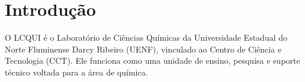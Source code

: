 \section{Introdução}

O LCQUI é o Laboratório de Ciências Químicas da Universidade Estadual do Norte Fluminense Darcy Ribeiro (UENF), vinculado ao Centro de Ciência e Tecnologia (CCT). Ele funciona como uma unidade de ensino, pesquisa e suporte técnico voltada para a área de química.
